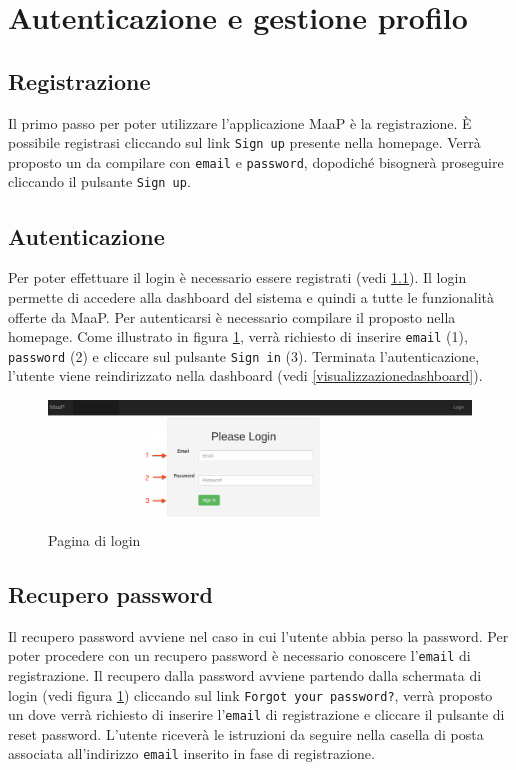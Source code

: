 \section{Autenticazione e gestione profilo}

	\subsection{Registrazione}
	\label{registrazione}

	Il primo passo per poter utilizzare l'applicazione MaaP è la registrazione. \`E possibile registrasi cliccando sul link \texttt{Sign up} presente nella homepage. Verrà proposto un  da compilare con \texttt{email} e \texttt{password}, dopodiché bisognerà proseguire cliccando il pulsante \texttt{Sign up}.

	\subsection{Autenticazione}
	\label{autenticazione}
	Per poter effettuare il login è necessario essere registrati (vedi \ref{registrazione}). Il login permette di accedere alla dashboard del sistema e quindi a tutte le funzionalità offerte da MaaP. Per autenticarsi è necessario compilare il  proposto nella homepage. Come illustrato in figura \ref{fig:login}, verrà richiesto di inserire \texttt{email} (1), \texttt{password} (2) e cliccare sul pulsante \texttt{Sign in} (3). Terminata l'autenticazione, l'utente viene reindirizzato nella dashboard (vedi \ref{visualizzazionedashboard}).

	\begin{figure}[H]
		\centering \includegraphics[width=1\textwidth]{img/login.png}
	\caption{ \label{fig:login} Pagina di login}
	\end{figure}

	\subsection{Recupero password}
	\label{recuperopassword}
	Il recupero password avviene nel caso in cui l'utente abbia perso la password. Per poter procedere con un recupero password è necessario conoscere l'\texttt{email} di registrazione. Il recupero dalla password avviene partendo dalla schermata di login (vedi figura \ref{fig:login}) cliccando sul link \texttt{Forgot your password?}, verrà proposto un  dove verrà richiesto di inserire l'\texttt{email} di registrazione e cliccare il pulsante di reset password. L'utente riceverà le istruzioni da seguire nella casella di posta associata all'indirizzo \texttt{email} inserito in fase di registrazione.


